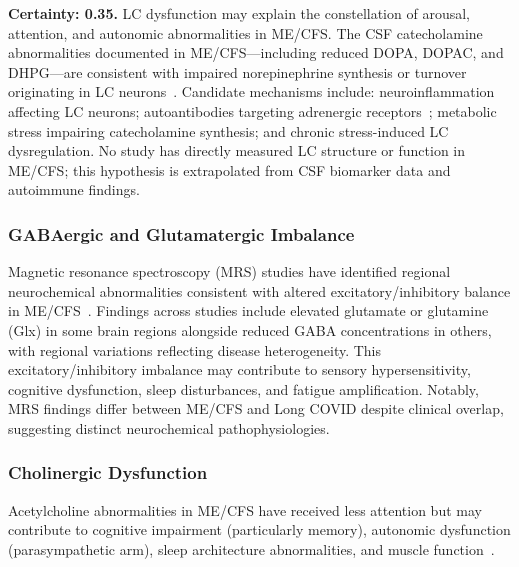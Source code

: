 \begin{hypothesis}
\label{hyp:lc-dysfunction}
\textbf{Certainty: 0.35.} LC dysfunction may explain the constellation of arousal, attention, and autonomic abnormalities in ME/CFS. The CSF catecholamine abnormalities documented in ME/CFS---including reduced DOPA, DOPAC, and DHPG---are consistent with impaired norepinephrine synthesis or turnover originating in LC neurons~\cite{walitt2024deep}. Candidate mechanisms include: neuroinflammation affecting LC neurons; autoantibodies targeting adrenergic receptors~\cite{Loebel2016}; metabolic stress impairing catecholamine synthesis; and chronic stress-induced LC dysregulation. No study has directly measured LC structure or function in ME/CFS; this hypothesis is extrapolated from CSF biomarker data and autoimmune findings.
\end{hypothesis}

\subsubsection{GABAergic and Glutamatergic Imbalance}

\begin{observation}
\label{obs:gaba-glut}
Magnetic resonance spectroscopy (MRS) studies have identified regional neurochemical abnormalities consistent with altered excitatory/inhibitory balance in ME/CFS~\cite{Godlewska2025MRS}. Findings across studies include elevated glutamate or glutamine (Glx) in some brain regions alongside reduced GABA concentrations in others, with regional variations reflecting disease heterogeneity. This excitatory/inhibitory imbalance may contribute to sensory hypersensitivity, cognitive dysfunction, sleep disturbances, and fatigue amplification. Notably, MRS findings differ between ME/CFS and Long COVID despite clinical overlap, suggesting distinct neurochemical pathophysiologies.
\end{observation}

\subsubsection{Cholinergic Dysfunction}

Acetylcholine abnormalities in ME/CFS have received less attention but may contribute to cognitive impairment (particularly memory), autonomic dysfunction (parasympathetic arm), sleep architecture abnormalities, and muscle function~\cite{Loebel2016,walitt2024deep}.

